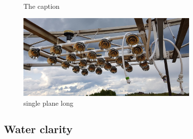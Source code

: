 \begin{figure} %
    \centering
    \quad
    \caption[The caption]
    {The caption}
\end{figure}

\begin{figure} %
    \includegraphics[width=0.8\textwidth]{diagrams/5-chips/single_plane.jpg}
    \caption[single plane short]
    {single plane long}
    \label{fig:single_plane}
\end{figure}

\subsection{Water clarity} %
\label{sec:chips_detector_water} %

